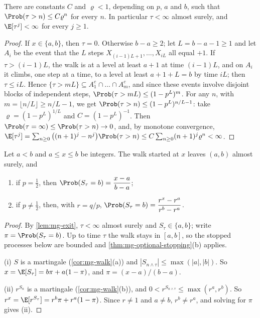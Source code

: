 \begin{lemma}\label{lem:mg-exit}
There are constants $C$ and $\varrho<1$, depending on $p$, $a$ and $b$, such that
$\Prob(\tau>n)\le C\varrho^n$ for every $n$. In particular $\tau<\infty$ almost surely, and
$\E[\tau^j]<\infty$ for every $j\ge1$.
\end{lemma}

\begin{proof}
If $x\in\{a,b\}$, then $\tau=0$. Otherwise $b-a\ge2$; let $L=b-a-1\ge1$ and let $A_i$ be the
event that the $L$ steps $X_{(i-1)L+1},\dots,X_{iL}$ all equal $+1$. If $\tau>(i-1)L$, the walk
is at a level at least $a+1$ at time $(i-1)L$, and on $A_i$ it climbs, one step at a time, to
a level at least $a+1+L=b$ by time $iL$; then $\tau\le iL$. Hence
$\{\tau>mL\}\subseteq A_1^c\cap\dots\cap A_m^c$, and since these events involve disjoint
blocks of independent steps, $\Prob(\tau>mL)\le(1-p^L)^m$. For any $n$, with
$m=\lfloor n/L\rfloor\ge n/L-1$, we get $\Prob(\tau>n)\le(1-p^L)^{n/L-1}$: take
$\varrho=(1-p^L)^{1/L}$ and $C=(1-p^L)^{-1}$. Then
$\Prob(\tau=\infty)\le\Prob(\tau>n)\to0$, and, by monotone convergence,
$\E[\tau^j]=\sum_{n\ge0}\big((n+1)^j-n^j\big)\Prob(\tau>n)\le C\sum_{n\ge0}(n+1)^j\varrho^n<\infty$.
\end{proof}

\begin{theorem}\label{thm:mg-gamblers-ruin}
Let $a<b$ and $a\le x\le b$ be integers. The walk started at $x$ leaves $(a,b)$ almost surely,
and
\begin{enumerate}[label=(\roman*)]
  \item if $p=\frac12$, then $\displaystyle\Prob(S_\tau=b)=\frac{x-a}{b-a}$;
  \item if $p\ne\frac12$, then, with $r=q/p$, $\displaystyle\Prob(S_\tau=b)=\frac{r^x-r^a}{r^b-r^a}$.
\end{enumerate}
\end{theorem}

\begin{proof}
By \cref{lem:mg-exit}, $\tau<\infty$ almost surely and $S_\tau\in\{a,b\}$; write
$\pi=\Prob(S_\tau=b)$. Up to time $\tau$ the walk stays in $[a,b]$, so the stopped processes
below are bounded and \cref{thm:mg-optional-stopping}(b) applies.

(i) $S$ is a martingale (\cref{cor:mg-walk}(a)) and $|S_{n\wedge\tau}|\le\max(|a|,|b|)$. So
$x=\E[S_\tau]=b\pi+a(1-\pi)$, and $\pi=(x-a)/(b-a)$.

(ii) $r^{S_n}$ is a martingale (\cref{cor:mg-walk}(b)), and $0<r^{S_{n\wedge\tau}}\le\max(r^a,r^b)$.
So $r^x=\E[r^{S_\tau}]=r^b\pi+r^a(1-\pi)$. Since $r\ne1$ and $a\ne b$, $r^b\ne r^a$, and solving
for $\pi$ gives (ii).
\end{proof}

